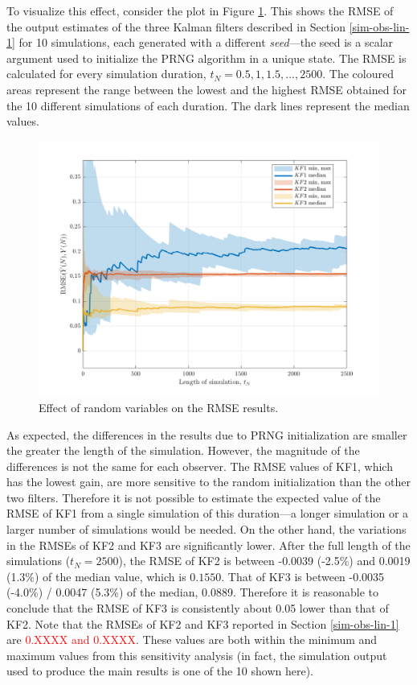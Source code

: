 To visualize this effect, consider the plot in Figure \ref{fig:rod-obs-sim-1-3KF-seed-crmse-statsplot}. This shows the \gls{RMSE} of the output estimates of the three Kalman filters described in Section \ref{sim-obs-lin-1} for 10 simulations, each generated with a different \textit{seed}—the seed is a scalar argument used to initialize the PRNG algorithm in a unique state. The \gls{RMSE} is calculated for every simulation duration, $t_N=0.5,1,1.5,...,2500$. The coloured areas represent the range between the lowest and the highest \gls{RMSE} obtained for the 10 different simulations of each duration. The dark lines represent the median values.

\begin{figure}[htp]
	\centering
	\includegraphics[width=14cm]{images/rod_obs_sim1_3KF_seed_crmse_statsplot.pdf}
	\caption{Effect of random variables on the \gls{RMSE} results.}
	\label{fig:rod-obs-sim-1-3KF-seed-crmse-statsplot}
\end{figure}

As expected, the differences in the results due to PRNG initialization are smaller the greater the length of the simulation. However, the magnitude of the differences is not the same for each observer. The \gls{RMSE} values of KF1, which has the lowest gain, are more sensitive to the random initialization than the other two filters. Therefore it is not possible to estimate the expected value of the \gls{RMSE} of KF1 from a single simulation of this duration---a longer simulation or a larger number of simulations would be needed. On the other hand, the variations in the \gls{RMSE}s of KF2 and KF3 are significantly lower. After the full length of the simulations ($t_N=2500$), the RMSE of KF2 is between -0.0039 (-2.5\%) and 0.0019 (1.3\%) of the median value, which is $0.1550$.  That of KF3 is between -0.0035 (-4.0\%) / 0.0047 (5.3\%) of the median, 0.0889.  Therefore it is reasonable to conclude that the \gls{RMSE} of KF3 is consistently about 0.05 lower than that of KF2. Note that the \gls{RMSE}s of KF2 and KF3 reported in Section \ref{sim-obs-lin-1} are \textcolor{red}{0.XXXX and 0.XXXX}. These values are both within the minimum and maximum values from this sensitivity analysis (in fact, the simulation output used to produce the main results is one of the 10 shown here).

